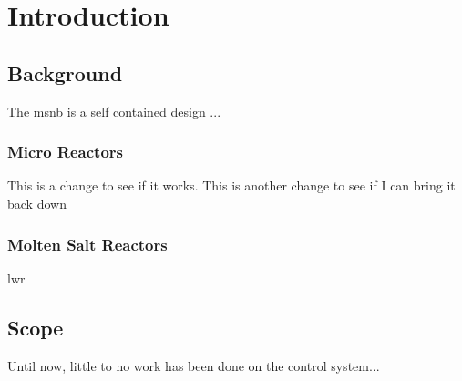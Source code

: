 \chapter{Introduction}
\label{Chapter:Introduction}

\section{Background}
The \acf{msnb} is a self contained design \cite{CarterPHD,PetersonMS}... 

\subsection{Micro Reactors}
This is a change to see if it works. This is another change to see if I can bring it back down

\subsection{Molten Salt Reactors}
\acf{lwr}


\section{Scope}
Until now, little to no work has been done on the control system... 
